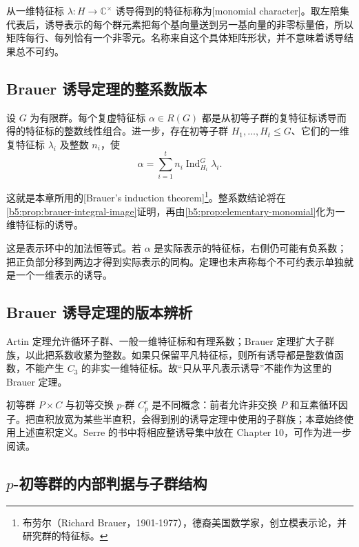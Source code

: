 \ProseParagraphBreak
从一维特征标 \(\lambda:H\rightarrow\mathbb C^\times\) 诱导得到的特征标称为[monomial character]。取左陪集代表后，诱导表示的每个群元素把每个基向量送到另一基向量的非零标量倍，所以矩阵每行、每列恰有一个非零元。名称来自这个具体矩阵形状，并不意味着诱导结果总不可约。

\subsection{Brauer 诱导定理的整系数版本}
\label{b5:subsec:0503:02}

\begin{theorem}\label{b5:thm:brauer-induction}
	设 \(G\) 为有限群。每个复虚特征标 \(\alpha\in R(G)\) 都是从初等子群的复特征标诱导而得的特征标的整数线性组合。进一步，存在初等子群 \(H_1,\ldots,H_t\le G\)、它们的一维复特征标 \(\lambda_i\) 及整数 \(n_i\)，使
	\[
		\alpha=\sum_{i=1}^t n_i\operatorname{Ind}_{H_i}^G\lambda_i.
	\]
\end{theorem}
这就是本章所用的[Brauer's induction theorem]\footnote{布劳尔（Richard Brauer，1901-1977），德裔美国数学家，创立模表示论，并研究群的特征标。}。整系数结论将在\cref{b5:prop:brauer-integral-image}证明，再由\cref{b5:prop:elementary-monomial}化为一维特征标的诱导。

\ProseParagraphBreak
这是表示环中的加法恒等式。若 \(\alpha\) 是实际表示的特征标，右侧仍可能有负系数；把正负部分移到两边才得到实际表示的同构。定理也未声称每个不可约表示单独就是一个一维表示的诱导。

\subsection{Brauer 诱导定理的版本辨析}
\label{b5:subsec:0503:03}

Artin 定理允许循环子群、一般一维特征标和有理系数；Brauer 定理扩大子群族，以此把系数收紧为整数。如果只保留平凡特征标，则所有诱导都是整数值函数，不能产生 \(C_3\) 的非实一维特征标。故“只从平凡表示诱导”不能作为这里的 Brauer 定理。

\ProseParagraphBreak
初等群 \(P\times C\) 与初等交换 \(p\)-群 \(C_p^r\) 是不同概念：前者允许非交换 \(P\) 和互素循环因子。把直积放宽为某些半直积，会得到别的诱导定理中使用的子群族；本章始终使用上述直积定义。Serre 的书中将相应整诱导集中放在 Chapter 10，可作为进一步阅读\cite[Chapter 10, pp. 74--80]{Serre1977FiniteRepresentations}。

\subsection{\texorpdfstring{\(p\)-初等群的内部判据与子群结构}{p-初等群的内部判据与子群结构}}
\label{b5:subsec:0503:04}

